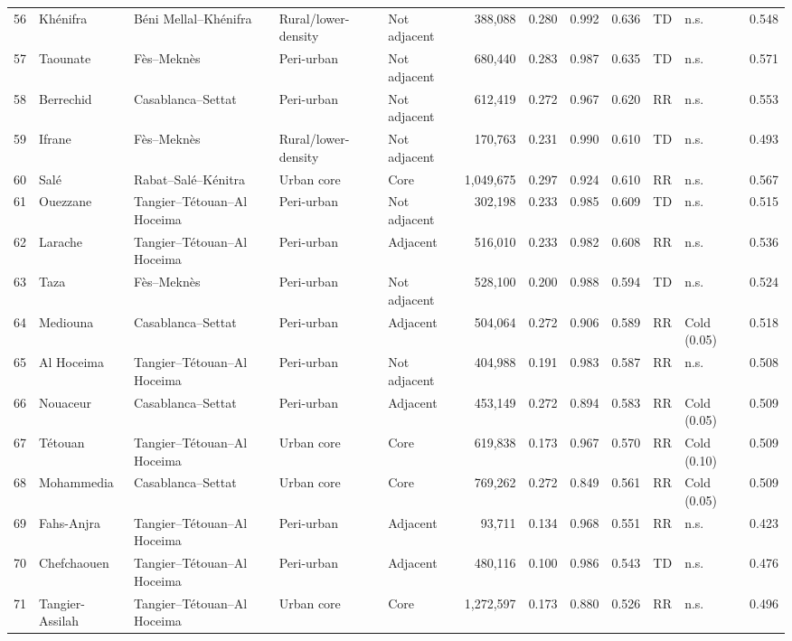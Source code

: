 \documentclass[10pt]{article}
\begin{document}
\begin{longtable}{@{}r>{\raggedright\arraybackslash}p{2.9cm}>{\raggedright\arraybackslash}p{3.3cm}llrrrrllr@{}}
56 & Khénifra & Béni Mellal--Khénifra & Rural/lower-density & Not adjacent & 388,088 & 0.280 & 0.992 & 0.636 & TD & n.s. & 0.548 \\
57 & Taounate & Fès--Meknès & Peri-urban & Not adjacent & 680,440 & 0.283 & 0.987 & 0.635 & TD & n.s. & 0.571 \\
58 & Berrechid & Casablanca--Settat & Peri-urban & Not adjacent & 612,419 & 0.272 & 0.967 & 0.620 & RR & n.s. & 0.553 \\
59 & Ifrane & Fès--Meknès & Rural/lower-density & Not adjacent & 170,763 & 0.231 & 0.990 & 0.610 & TD & n.s. & 0.493 \\
60 & Salé & Rabat--Salé--Kénitra & Urban core & Core & 1,049,675 & 0.297 & 0.924 & 0.610 & RR & n.s. & 0.567 \\
61 & Ouezzane & Tangier--Tétouan--Al Hoceima & Peri-urban & Not adjacent & 302,198 & 0.233 & 0.985 & 0.609 & TD & n.s. & 0.515 \\
62 & Larache & Tangier--Tétouan--Al Hoceima & Peri-urban & Adjacent & 516,010 & 0.233 & 0.982 & 0.608 & RR & n.s. & 0.536 \\
63 & Taza & Fès--Meknès & Peri-urban & Not adjacent & 528,100 & 0.200 & 0.988 & 0.594 & TD & n.s. & 0.524 \\
64 & Mediouna & Casablanca--Settat & Peri-urban & Adjacent & 504,064 & 0.272 & 0.906 & 0.589 & RR & Cold (0.05) & 0.518 \\
65 & Al Hoceima & Tangier--Tétouan--Al Hoceima & Peri-urban & Not adjacent & 404,988 & 0.191 & 0.983 & 0.587 & RR & n.s. & 0.508 \\
66 & Nouaceur & Casablanca--Settat & Peri-urban & Adjacent & 453,149 & 0.272 & 0.894 & 0.583 & RR & Cold (0.05) & 0.509 \\
67 & Tétouan & Tangier--Tétouan--Al Hoceima & Urban core & Core & 619,838 & 0.173 & 0.967 & 0.570 & RR & Cold (0.10) & 0.509 \\
68 & Mohammedia & Casablanca--Settat & Urban core & Core & 769,262 & 0.272 & 0.849 & 0.561 & RR & Cold (0.05) & 0.509 \\
69 & Fahs-Anjra & Tangier--Tétouan--Al Hoceima & Peri-urban & Adjacent & 93,711 & 0.134 & 0.968 & 0.551 & RR & n.s. & 0.423 \\
70 & Chefchaouen & Tangier--Tétouan--Al Hoceima & Peri-urban & Adjacent & 480,116 & 0.100 & 0.986 & 0.543 & TD & n.s. & 0.476 \\
71 & Tangier-Assilah & Tangier--Tétouan--Al Hoceima & Urban core & Core & 1,272,597 & 0.173 & 0.880 & 0.526 & RR & n.s. & 0.496 \\

\end{longtable}
\end{document}
